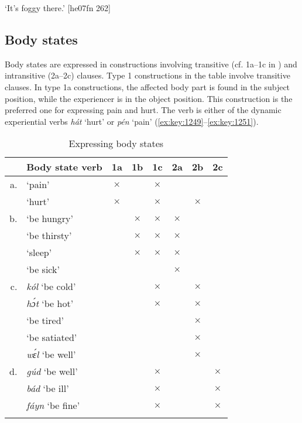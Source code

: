 \glt ‘It’s foggy there.’ [he07fn 262]
\z

\subsection{Body states}\label{sec:9.3.8}

Body states are expressed in constructions involving transitive (cf. 1a–1c in ) and intransitive (2a–2c) clauses. Type 1 constructions in the table involve transitive clauses. In type 1a constructions, the affected body part\is{} is found in the subject position, while the experiencer is in the object position. This construction is the preferred one for expressing pain and hurt. The verb is either of the dynamic experiential verbs \textit{hát} ‘hurt’ or \textit{pén} ‘pain’ (\ref{ex:key:1249}–\ref{ex:key:1251}).

\begin{table}
\caption{Expressing body states}
\label{tab:key:9.11}
\begin{tabularx}{\textwidth}{rl CCC CCC}
\lsptoprule

& Body state verb & 1a & 1b & 1c & 2a & 2b & 2c\\
\midrule
a. &  ‘pain’ & $\times$ &  & $\times$ &  &  & \\
&  ‘hurt’ & $\times$ &  & $\times$ &  & $\times$ & \\

\tablevspace
b. &  ‘be hungry’ &  & $\times$ & $\times$ & $\times$ &  & \\
&  ‘be thirsty’ &  & $\times$ & $\times$ & $\times$ &  & \\
&  ‘sleep’ &  & $\times$ & $\times$ & $\times$ &  & \\
&  ‘be sick’ &  &  &  & $\times$ &  & \\

\tablevspace
c. & \textit{kól} ‘be cold’ &  &  & $\times$ &  & $\times$ & \\
& \textit{hɔ́t} ‘be hot’ &  &  & $\times$ &  & $\times$ & \\
&  ‘be tired’ &  &  &  &  & $\times$ & \\
&  ‘be satiated’ &  &  &  &  & $\times$ & \\
& \textit{wɛ́l} ‘be well’ &  &  &  &  & $\times$ & \\

\tablevspace
d. & \textit{gúd} ‘be well’ &  &  & $\times$ &  &  & $\times$\\
& \textit{bád} ‘be ill’ &  &  & $\times$ &  &  & $\times$\\
& \textit{fáyn} ‘be fine’ &  &  & $\times$ &  &  & $\times$\\
\lspbottomrule
\end{tabularx}
\end{table}



